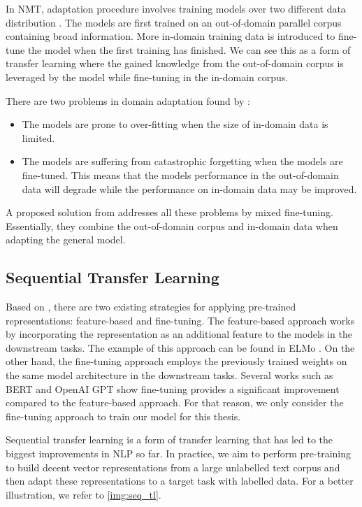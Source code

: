 In NMT, adaptation procedure involves training models over two different data distribution . The models are first trained on an out-of-domain parallel corpus containing broad information. More in-domain training data is introduced to fine-tune the model when the first training has finished. We can see this as a form of transfer learning where the gained knowledge from the out-of-domain corpus is leveraged by the model while fine-tuning in the in-domain corpus.

There are two problems in domain adaptation found by :
\begin{itemize}
    \item The models are prone to over-fitting when the size of in-domain data is limited.
    \item The models are suffering from catastrophic forgetting when the models are fine-tuned. This means that the models performance in the out-of-domain data will degrade while the performance on in-domain data may be improved.
\end{itemize}
A proposed solution from  addresses all these problems by mixed fine-tuning. Essentially, they combine the out-of-domain corpus and in-domain data when adapting the general model.

\subsection{Sequential Transfer Learning}
Based on , there are two existing strategies for applying pre-trained representations: feature-based and fine-tuning. The feature-based approach works by incorporating the representation as an additional feature to the models in the downstream tasks. The example of this approach can be found in ELMo . On the other hand, the fine-tuning approach employs the previously trained weights on the same model architecture in the downstream tasks. Several works such as BERT  and OpenAI GPT  show fine-tuning provides a significant improvement compared to the feature-based approach. For that reason, we only consider the fine-tuning approach to train our model for this thesis.

Sequential transfer learning is a form of transfer learning that has led to the biggest improvements in NLP so far. In practice, we aim to perform pre-training to build decent vector representations from a large unlabelled text corpus and then adapt these representations to a target task with labelled data. For a better illustration, we refer to \cref{img:seq_tl}.

